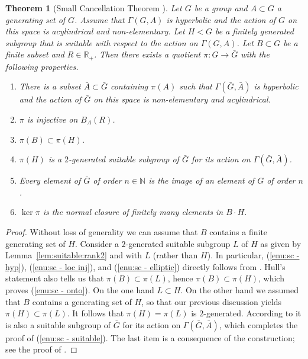 \documentclass[JEP,XML,SOM,Unicode]{cedram}
\newtheorem{theorem}{Theorem}[section]
\theoremstyle{definition}
\begin{document}
\begin{theorem}[Small Cancellation Theorem {\cite[Th.\,7.1]{hull}}]
\label{thm:sc}
Let $G$ be a group and $A \subset G$ a generating set of $G$.
Assume that $\Gamma(G,A)$ is hyperbolic and the action of $G$ on this space is acylindrical and non-elementary.
Let $H < G$ be a finitely generated subgroup that is suitable with respect to the action on $\Gamma(G,A)$. Let $B \subset G$ be a finite subset and $R \in \mathbb R_+$. Then there exists a quotient $\pi \colon G \to \bar G$ with the following properties.
\begin{enumerate}
\item\label{enu:sc - hyp} There is a subset $\bar A \subset \bar G$ containing $\pi(A)$ such that $\Gamma(\bar G, \bar A)$ is hyperbolic and the action of $\bar G$ on this space is non-elementary and acylindrical.
\item \label{enu:sc - loc inj} $\pi$ is injective on $B_A(R)$.
\item \label{enu:sc - onto} $\pi(B) \subset \pi(H)$.
\item \label{enu:sc - suitable} $\pi(H)$ is a $2$-generated suitable subgroup of $\bar G$ for its action on $\Gamma(\bar G, \bar A)$.
\item \label{enu:sc - elliptic} Every element of $\bar G$ of order $n \in \mathbb{N}$ is the image of an element of $G$ of order $n$.
\item \label{enu:sc - fp} $\ker\pi$ is the normal closure of finitely many elements in $B \cdot H$.
\end{enumerate}
\end{theorem}

\begin{proof}
Without loss of generality we can assume that $B$ contains a finite generating set of $H$.
Consider a $2$-generated suitable subgroup $L$ of $H$ as given by Lemma~\ref{lem:suitable:rank2} and \cite[Th.\,7.1]{hull} with $L$ (rather than $H$).
In particular, (\ref{enu:sc - hyp}), (\ref{enu:sc - loc inj}), and (\ref{enu:sc - elliptic}) directly follows from \cite[Th.\,7.1]{hull}.
Hull's statement also tells us that $\pi(B) \subset \pi(L)$, hence $\pi(B) \subset \pi(H)$, which proves (\ref{enu:sc - onto}).
On the one hand $L \subset H$.
On the other hand we assumed that $B$ contains a generating set of $H$, so that our previous discussion yields $\pi(H) \subset \pi(L)$.
It follows that $\pi(H) = \pi(L)$ is $2$-generated.
According to \cite[Th.\,7.1]{hull} it is also a suitable subgroup of $\bar G$ for its action on $\Gamma(\bar G, \bar A)$, which completes the proof of (\ref{enu:sc - suitable}).
The last item is a consequence of the construction; see the proof of \cite[Th.\,7.1]{hull}.
\end{proof}
\end{document}

